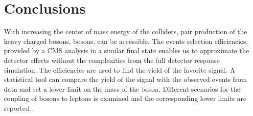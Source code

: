 \section{Conclusions}\label{sec:conclusion} 
With increasing the center of mass energy of the colliders, pair production of the heavy charged bosons, \wprime bosons, can be accessible. The events selection efficiencies, provided by a CMS analysis in a similar final state enables us to approximate the detector effects without the complexities from the full detector response simulation. The efficiencies are used to find the yield of the favorite signal. A statistical tool can compare the yield of the signal with the observed events from data and set a lower limit on the mass of the \wprime boson. Different 
scenarios for the coupling of \wprime bosons to leptons is examined and the corresponding lower limits are reported...